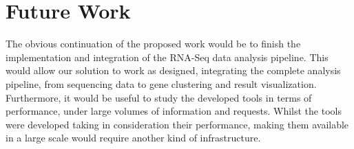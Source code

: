 \section{Future Work}

The obvious continuation of the proposed work would be to finish the
implementation and integration of the RNA-Seq data analysis pipeline. This would
allow our solution to work as designed, integrating the complete analysis
pipeline, from sequencing data to gene clustering and result visualization.
Furthermore, it would be useful to study the developed tools in terms of
performance, under large volumes of information and requests. Whilst the tools
were developed taking in consideration their performance, making them available
in a large scale would require another kind of infrastructure.
